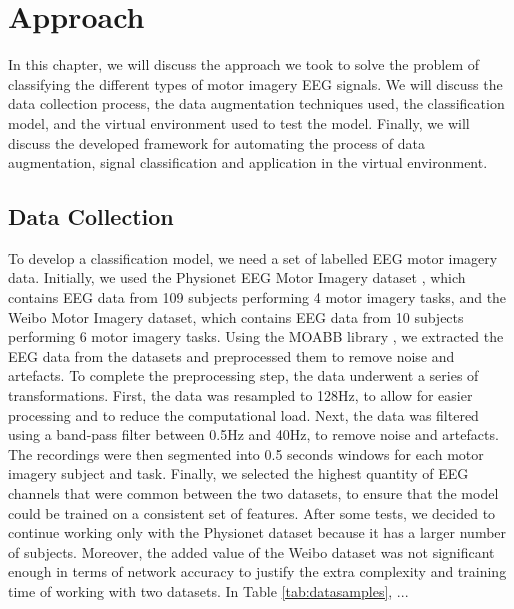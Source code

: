 \chapter{Approach}\label{ch:approach}
In this chapter, we will discuss the approach we took to solve the problem of classifying the different types of motor imagery EEG signals.
We will discuss the data collection process, the data augmentation techniques used, the classification model, and the virtual environment used to test the model. 
Finally, we will discuss the developed framework for automating the process of data augmentation, signal classification and application in the virtual environment.

\section{Data Collection}
To develop a classification model, we need a set of labelled EEG motor imagery data.
Initially, we used the Physionet EEG Motor Imagery dataset \cite{goldberger2000physiobank}, which contains EEG data from 109 subjects performing 4 motor imagery tasks, and the Weibo Motor Imagery \cite{yi2014evaluation} dataset, which contains EEG data from 10 subjects performing 6 motor imagery tasks.
Using the MOABB library \cite{Aristimunha_Mother_of_all_2023, chevallier2024largest, jayaram2018moabb}, we extracted the EEG data from the datasets and preprocessed them to remove noise and artefacts.
To complete the preprocessing step, the data underwent a series of transformations.
First, the data was resampled to 128Hz, to allow for easier processing and to reduce the computational load.
Next, the data was filtered using a band-pass filter between 0.5Hz and 40Hz, to remove noise and artefacts.
The recordings were then segmented into 0.5 seconds windows for each motor imagery subject and task.
Finally, we selected the highest quantity of EEG channels that were common between the two datasets, to ensure that the model could be trained on a consistent set of features.
After some tests, we decided to continue working only with the Physionet dataset because it has a larger number of subjects.
Moreover, the added value of the Weibo dataset was not significant enough in terms of network accuracy to justify the extra complexity and training time of working with two datasets.
In Table \ref{tab:datasamples}, ...
